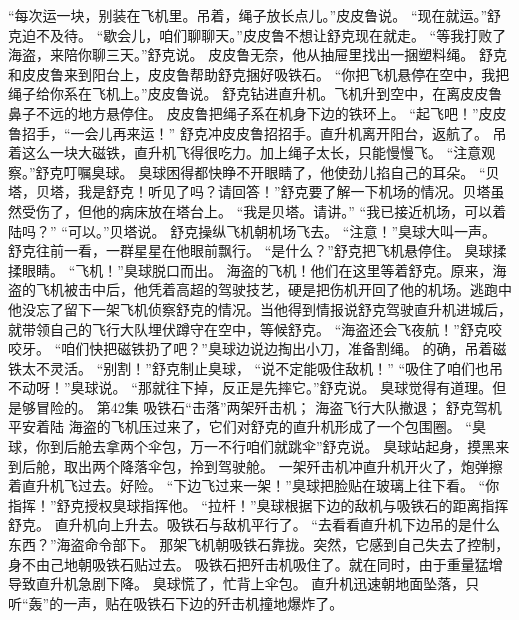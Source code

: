 \documentclass[a4paper,12pt,UTF8,twoside]{ctexbook}
\begin{document}
        “每次运一块，别装在飞机里。吊着，绳子放长点儿。”皮皮鲁说。 
        “现在就运。”舒克迫不及待。 
        “歇会儿，咱们聊聊天。”皮皮鲁不想让舒克现在就走。 
        “等我打败了海盗，来陪你聊三天。”舒克说。 
        皮皮鲁无奈，他从抽屉里找出一捆塑料绳。 
        舒克和皮皮鲁来到阳台上，皮皮鲁帮助舒克捆好吸铁石。 
        “你把飞机悬停在空中，我把绳子给你系在飞机上。”皮皮鲁说。 
        舒克钻进直升机。飞机升到空中，在离皮皮鲁鼻子不远的地方悬停住。 
        皮皮鲁把绳子系在机身下边的铁环上。 
        “起飞吧！”皮皮鲁招手，“一会儿再来运！” 
        舒克冲皮皮鲁招招手。直升机离开阳台，返航了。 
        吊着这么一块大磁铁，直升机飞得很吃力。加上绳子太长，只能慢慢飞。 
        “注意观察。”舒克叮嘱臭球。 
        臭球困得都快睁不开眼睛了，他使劲儿掐自己的耳朵。 
        “贝塔，贝塔，我是舒克！听见了吗？请回答！”舒克要了解一下机场的情况。贝塔虽然受伤了，但他的病床放在塔台上。 
        “我是贝塔。请讲。” 
        “我已接近机场，可以着陆吗？” 
        “可以。”贝塔说。 
        舒克操纵飞机朝机场飞去。 
        “注意！”臭球大叫一声。 
        舒克往前一看，一群星星在他眼前飘行。 
        “是什么？”舒克把飞机悬停住。 
        臭球揉揉眼睛。 
        “飞机！”臭球脱口而出。 
        海盗的飞机！他们在这里等着舒克。原来，海盗的飞机被击中后，他凭着高超的驾驶技艺，硬是把伤机开回了他的机场。逃跑中他没忘了留下一架飞机侦察舒克的情况。当他得到情报说舒克驾驶直升机进城后，就带领自己的飞行大队埋伏蹲守在空中，等候舒克。 
        “海盗还会飞夜航！”舒克咬咬牙。 
        “咱们快把磁铁扔了吧？”臭球边说边掏出小刀，准备割绳。 
        的确，吊着磁铁太不灵活。 
        “别割！”舒克制止臭球，  “说不定能吸住敌机！” 
        “吸住了咱们也吊不动呀！”臭球说。 
        “那就往下掉，反正是先摔它。”舒克说。 
        臭球觉得有道理。但是够冒险的。   第42集 
        吸铁石“击落”两架歼击机； 
        海盗飞行大队撤退； 
        舒克驾机平安着陆   
        海盗的飞机压过来了，它们对舒克的直升机形成了一个包围圈。 
        “臭球，你到后舱去拿两个伞包，万一不行咱们就跳伞”舒克说。 
        臭球站起身，摸黑来到后舱，取出两个降落伞包，拎到驾驶舱。 
        一架歼击机冲直升机开火了，炮弹擦着直升机飞过去。好险。 
        “下边飞过来一架！”臭球把脸贴在玻璃上往下看。 
        “你指挥！”舒克授权臭球指挥他。 
        “拉杆！”臭球根据下边的敌机与吸铁石的距离指挥舒克。 
        直升机向上升去。吸铁石与敌机平行了。 
        “去看看直升机下边吊的是什么东西？”海盗命令部下。 
        那架飞机朝吸铁石靠拢。突然，它感到自己失去了控制，身不由己地朝吸铁石贴过去。 
        吸铁石把歼击机吸住了。就在同时，由于重量猛增导致直升机急剧下降。 
        臭球慌了，忙背上伞包。 
        直升机迅速朝地面坠落，只听“轰”的一声，贴在吸铁石下边的歼击机撞地爆炸了。 
\end{document}

